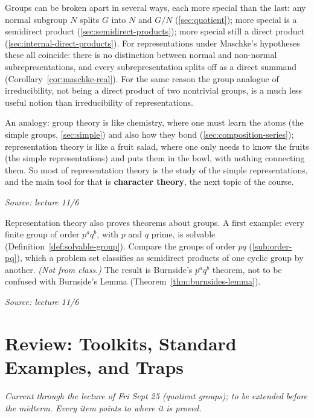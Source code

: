 \documentclass[11pt]{report}
\newcommand{\srcline}[1]{\par\hfill{\footnotesize\textit{Source: #1}}}
\begin{document}
\begin{rembox}\label{rem:chemistry-fruit-salad}
Groups can be broken apart in several ways, each more special than the last: any normal subgroup $N$ splits $G$ into $N$ and $G/N$ (\ref{sec:quotient}); more special is a semidirect product (\ref{sec:semidirect-products}); more special still a direct product (\ref{sec:internal-direct-products}). For representations under Maschke's hypotheses these all coincide: there is no distinction between normal and non-normal subrepresentations, and every subrepresentation splits off as a direct summand (Corollary~\ref{cor:maschke-real}). For the same reason the group analogue of irreducibility, not being a direct product of two nontrivial groups, is a much less useful notion than irreducibility of representations.

An analogy: group theory is like chemistry, where one must learn the atoms (the simple groups, \ref{sec:simple}) and also how they bond (\ref{sec:composition-series}); representation theory is like a fruit salad, where one only needs to know the fruits (the simple representations) and puts them in the bowl, with nothing connecting them. So most of representation theory is the study of the simple representations, and the main tool for that is \textbf{character theory}, the next topic of the course.
\srcline{lecture 11/6}
\end{rembox}

\begin{rembox}\label{rem:payoff-burnside}
Representation theory also proves theorems about groups. A first example: every finite group of order $p^a q^b$, with $p$ and $q$ prime, is solvable (Definition~\ref{def:solvable-group}). Compare the groups of order $pq$ (\ref{sub:order-pq}), which a problem set classifies as semidirect products of one cyclic group by another.
\textit{(Not from class.)} The result is Burnside's $p^aq^b$ theorem, not to be confused with Burnside's Lemma (Theorem~\ref{thm:burnsides-lemma}).
\srcline{lecture 11/6}
\end{rembox}


\appendix
\chapter{Review: Toolkits, Standard Examples, and Traps}\label{ch:review}

\textit{Current through the lecture of Fri Sept 25 (quotient groups); to be extended before the midterm. Every item points to where it is proved.}
\end{document}
